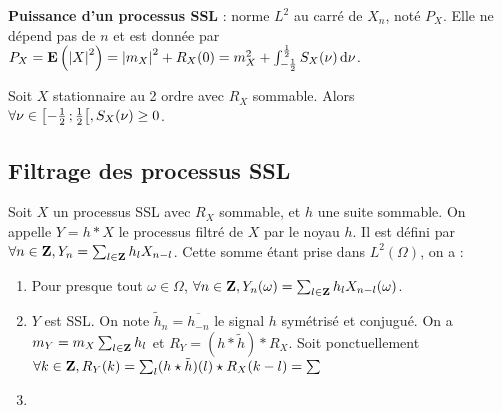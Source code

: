 	\begin{defn}
	\textbf{Puissance d'un processus SSL} : norme $L^2$ au carré de $X_n$, noté $P_X$.
	Elle ne dépend pas de $n$ et est donnée par $P_X = \mathbf{E} \left( \left\lvert X\right\rvert^2 \right) = \left\lvert m_X\right\rvert^2 + R_X(0) = m_X^2 + \int_{-\frac{1}{2}}^{\frac{1}{2}} S_X(\nu) \mathop{}\mathopen{}\mathrm{d} \nu$.
	\end{defn}
	
	\begin{pop}
		Soit $X$ stationnaire au 2 ordre avec $R_X$ sommable.
		Alors $\forall \nu \in \mathopen{}\mathclose{\left[-\frac{1}{2}\mathclose{}\mathpunct{};\frac{1}{2}\right[}, S_X(\nu) \geq 0$.
	\end{pop}

\subsection{Filtrage des processus SSL}

	\begin{pop}
		Soit $X$ un processus SSL avec $R_X$ sommable, et $h$ une suite sommable.
		On appelle $Y = h * X$ le processus filtré de $X$ par le noyau $h$.
		Il est défini par $\forall n \in \mathbf{Z}, Y_n = \sum_{l \in \mathbf{Z}} h_l X_{n - l}$.
		Cette somme étant prise dans $L^2(\Omega)$, on a :
		\begin{enumerate}
		\item
			Pour presque tout $\omega \in \Omega$, $\forall n \in \mathbf{Z}, Y_n(\omega) = \sum_{l \in \mathbf{Z}} h_l X_{n - l}(\omega)$.
		\item
			$Y$ est SSL. On note $\tilde{h}_n = \overline{h_{-n}}$ le signal $h$ symétrisé et conjugué.
			On a $m_Y = m_X \sum_{l \in \mathbf{Z}} h_l$ et $R_Y = (h * \tilde{h}) * R_X$.
			Soit ponctuellement $\forall k \in \mathbf{Z}, R_Y(k) = \sum_l (h \star \tilde{h})(l) \star R_X(k - l) = \sum$
		\item
		\end{enumerate}
	\end{pop}
